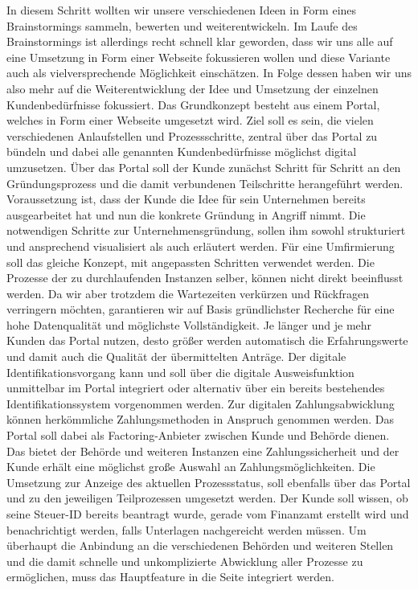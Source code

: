 In diesem Schritt wollten wir unsere verschiedenen Ideen in Form eines Brainstormings sammeln, bewerten und weiterentwickeln.
Im Laufe des Brainstormings ist allerdings recht schnell klar geworden, dass wir uns alle auf eine Umsetzung in Form einer Webseite fokussieren wollen und diese Variante auch als vielversprechende Möglichkeit einschätzen.
In Folge dessen haben wir uns also mehr auf die Weiterentwicklung der Idee und Umsetzung der einzelnen Kundenbedürfnisse fokussiert.
Das Grundkonzept besteht aus einem Portal, welches in Form einer Webseite umgesetzt wird. Ziel soll es sein, die vielen verschiedenen Anlaufstellen und Prozessschritte, zentral über das Portal zu bündeln und dabei alle genannten Kundenbedürfnisse möglichst digital umzusetzen.
Über das Portal soll der Kunde zunächst Schritt für Schritt an den Gründungsprozess und die damit verbundenen Teilschritte herangeführt werden. Voraussetzung ist, dass der Kunde die Idee für sein Unternehmen bereits ausgearbeitet hat und nun die konkrete Gründung in Angriff nimmt. Die notwendigen Schritte zur Unternehmensgründung, sollen ihm sowohl strukturiert und ansprechend visualisiert als auch erläutert werden. Für eine Umfirmierung soll das gleiche Konzept, mit angepassten Schritten verwendet werden. Die Prozesse der zu durchlaufenden Instanzen selber, können nicht direkt beeinflusst werden. Da wir aber trotzdem die Wartezeiten verkürzen und Rückfragen verringern möchten, garantieren wir auf Basis gründlichster Recherche für eine hohe Datenqualität und möglichste Vollständigkeit. Je länger und je mehr Kunden das Portal nutzen, desto größer werden automatisch die Erfahrungswerte und damit auch die Qualität der übermittelten Anträge.
Der digitale Identifikationsvorgang kann und soll über die digitale Ausweisfunktion unmittelbar im Portal integriert oder alternativ über ein bereits bestehendes Identifikationssystem vorgenommen werden. Zur digitalen Zahlungsabwicklung können herkömmliche Zahlungsmethoden in Anspruch genommen werden. Das Portal soll dabei als Factoring-Anbieter zwischen Kunde und Behörde dienen. Das bietet der Behörde und weiteren Instanzen eine Zahlungssicherheit und der Kunde erhält eine möglichst große Auswahl an Zahlungsmöglichkeiten.
Die Umsetzung zur Anzeige des aktuellen Prozessstatus, soll ebenfalls über das Portal und zu den jeweiligen Teilprozessen umgesetzt werden. Der Kunde soll wissen, ob seine Steuer-ID bereits beantragt wurde, gerade vom Finanzamt erstellt wird und benachrichtigt werden, falls Unterlagen nachgereicht werden müssen.
Um überhaupt die Anbindung an die verschiedenen Behörden und weiteren Stellen und die damit schnelle und unkomplizierte Abwicklung aller Prozesse zu ermöglichen, muss das Hauptfeature in die Seite integriert werden.
